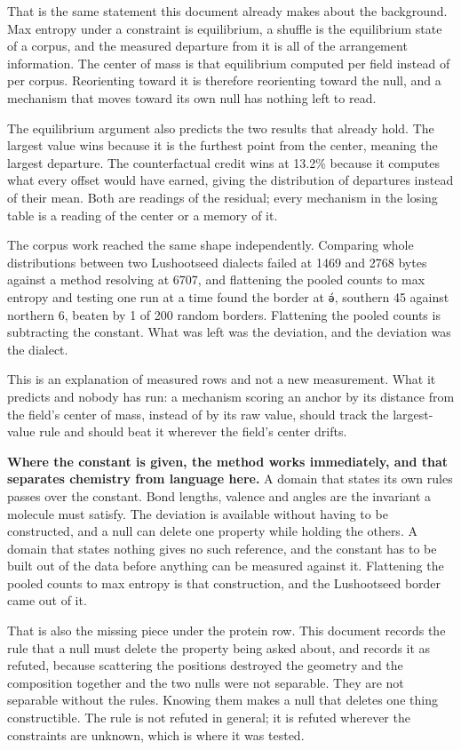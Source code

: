 That is the same statement this document already makes about the background. Max entropy under a constraint is equilibrium, a shuffle is the equilibrium state of a corpus, and the measured departure from it is all of the arrangement information. The center of mass is that equilibrium computed per field instead of per corpus. Reorienting toward it is therefore reorienting toward the null, and a mechanism that moves toward its own null has nothing left to read.

The equilibrium argument also predicts the two results that already hold. The largest value wins because it is the furthest point from the center, meaning the largest departure. The counterfactual credit wins at 13.2\% because it computes what every offset would have earned, giving the distribution of departures instead of their mean. Both are readings of the residual; every mechanism in the losing table is a reading of the center or a memory of it.

The corpus work reached the same shape independently. Comparing whole distributions between two Lushootseed dialects failed at 1469 and 2768 bytes against a method resolving at 6707, and flattening the pooled counts to max entropy and testing one run at a time found the border at \texttt{ə́}, southern 45 against northern 6, beaten by 1 of 200 random borders. Flattening the pooled counts is subtracting the constant. What was left was the deviation, and the deviation was the dialect.

This is an explanation of measured rows and not a new measurement. What it predicts and nobody has run: a mechanism scoring an anchor by its distance from the field's center of mass, instead of by its raw value, should track the largest-value rule and should beat it wherever the field's center drifts.

\textbf{Where the constant is given, the method works immediately, and that separates chemistry from language here.} A domain that states its own rules passes over the constant. Bond lengths, valence and angles are the invariant a molecule must satisfy. The deviation is available without having to be constructed, and a null can delete one property while holding the others. A domain that states nothing gives no such reference, and the constant has to be built out of the data before anything can be measured against it. Flattening the pooled counts to max entropy is that construction, and the Lushootseed border came out of it.

That is also the missing piece under the protein row. This document records the rule that a null must delete the property being asked about, and records it as refuted, because scattering the positions destroyed the geometry and the composition together and the two nulls were not separable. They are not separable without the rules. Knowing them makes a null that deletes one thing constructible. The rule is not refuted in general; it is refuted wherever the constraints are unknown, which is where it was tested.

